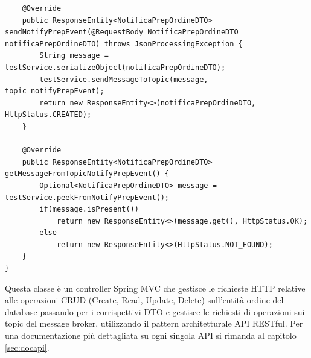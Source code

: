 \begin{lstlisting}
    @Override
    public ResponseEntity<NotificaPrepOrdineDTO> sendNotifyPrepEvent(@RequestBody NotificaPrepOrdineDTO notificaPrepOrdineDTO) throws JsonProcessingException {
        String message = testService.serializeObject(notificaPrepOrdineDTO);
        testService.sendMessageToTopic(message, topic_notifyPrepEvent);
        return new ResponseEntity<>(notificaPrepOrdineDTO, HttpStatus.CREATED);
    }

    @Override
    public ResponseEntity<NotificaPrepOrdineDTO> getMessageFromTopicNotifyPrepEvent() {
        Optional<NotificaPrepOrdineDTO> message = testService.peekFromNotifyPrepEvent();
        if(message.isPresent())
            return new ResponseEntity<>(message.get(), HttpStatus.OK);
        else
            return new ResponseEntity<>(HttpStatus.NOT_FOUND);
    }
}
\end{lstlisting}
Questa classe è un controller Spring MVC che gestisce le richieste HTTP relative alle operazioni CRUD (Create, Read, Update, Delete) sull'entità ordine del database passando per i corrispettivi DTO e gestisce le richiesti di operazioni sui topic del message broker, utilizzando il pattern architetturale API RESTful.
Per una documentazione più dettagliata su ogni singola API si rimanda al capitolo \vref{sec:docapi}.
